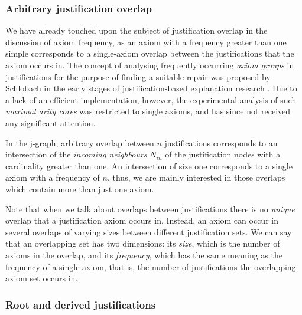 \subsubsection{Arbitrary justification overlap} 
\label{sec:overlap}

We have already touched upon the subject of justification overlap in the discussion of axiom frequency, as an axiom with a frequency greater than one simple corresponds to a single-axiom overlap between the justifications that the axiom occurs in. The concept of analysing frequently occurring \emph{axiom groups} in justifications for the purpose of finding a suitable repair was proposed by Schlobach in the early stages of justification-based explanation research \cite{schlobach05tf}. Due to a lack of an efficient implementation, however, the experimental analysis of such \emph{maximal arity cores} was restricted to single axioms, and has since not received any significant attention.

In the j-graph, arbitrary overlap between $n$ justifications corresponds to an intersection of the \emph{incoming neighbours} $N_{in}$ of the justification nodes with a cardinality greater than one. An intersection of size one corresponds to a single axiom with a frequency of $n$, thus, we are mainly interested in those overlaps which contain more than just one axiom.

Note that when we talk about overlaps between justifications there is no \emph{unique} overlap that a justification axiom occurs in. Instead, an axiom can occur in several overlaps of varying sizes between different justification sets. We can say that an overlapping set has two dimensions: its \emph{size}, which is the number of axioms in the overlap, and its \emph{frequency}, which has the same meaning as the frequency of a single axiom, that is, the number of justifications the overlapping axiom set occurs in.


\subsubsection{Root and derived justifications}


